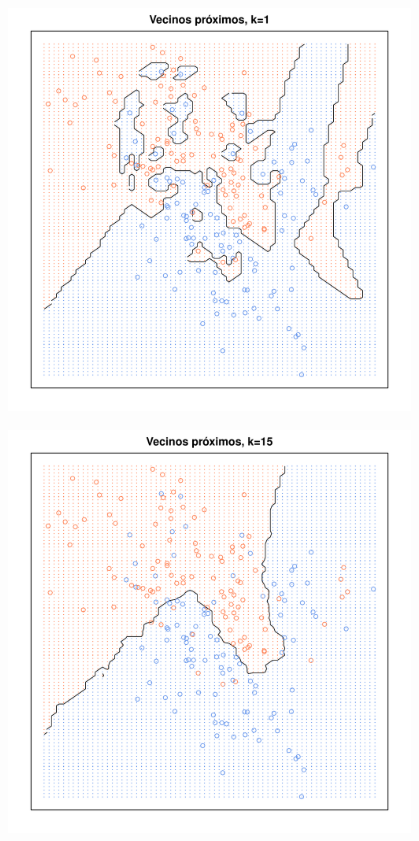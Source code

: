 \documentclass{beamer}
\begin{document}
\begin{frame}
\centering
\includegraphics[width=0.8\textwidth]{knn1.pdf}

\break

\begin{center}
\includegraphics[width=0.8\textwidth]{knn15.pdf}
\end{center}

\break


\end{frame}
\end{document}
